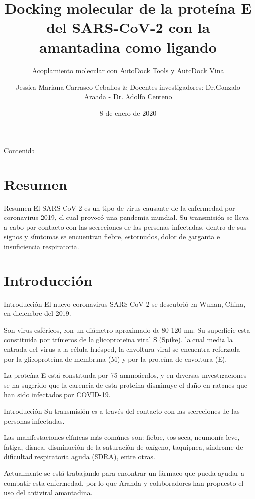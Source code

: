 \documentclass[11pt]{beamer}
\author[Jessica]{Jessica Mariana Carrasco Ceballos\inst{1} \& Docentes-investigadores: Dr.Gonzalo Aranda - Dr. Adolfo Centeno  \inst{1}}
\title[Docking molecular]{Docking molecular de la proteína E del SARS-CoV-2 con la amantadina como ligando}
\date{8 de enero de 2020}
\subtitle{Acoplamiento molecular con AutoDock Tools y AutoDock Vina}
\institute[UV]{
	\inst{1}
		Universidad Veracruzana. \\Instituto de Investigaciones Cerebrales.\\
		\vspace{2mm}
	
}
\begin{document}
	
	\begin{frame}
		\maketitle
	\end{frame}

	\begin{frame}{Contenido}
		\tableofcontents
	\end{frame}

	\section{Resumen}
		\begin{frame}{Resumen}
			\justifying El SARS-CoV-2 es un tipo de virus causante de la enfermedad por coronavirus 2019, el cual provocó una pandemia mundial. Su transmisión se lleva a cabo por contacto con las secreciones de las personas infectadas, dentro de sus signos y símtomas se encuentran fiebre, estornudos, dolor de garganta e insuficiencia respiratoria.
		\end{frame}
	
	\section{Introducción}
		\begin{frame}{Introducción}
			\justifying El nuevo coronavirus SARS-CoV-2 se descubrió en Wuhan, China, en diciembre del 2019. 
			
			Son virus esféricos, con un diámetro aproximado de 80-120 nm. Su superficie esta constituida por trímeros de la glicoproteína viral S (Spike), la cual media la entrada del virus a la célula huésped, la envoltura viral se encuentra reforzada por la glicoproteína de membrana (M) y por la proteína de envoltura (E).
			
			La proteína E está constituida por 75 aminoácidos, y en diversas investigaciones se ha sugerido que la carencia de esta proteína disminuye el daño en ratones que han sido infectados por COVID-19.
			\end{frame}
			
			\begin{frame}{Introducción}
			Su transmisión es a través del contacto con las secreciones de las personas infectadas.
			
			Las manifestaciones clínicas más comúnes son: fiebre, tos seca, neumonía leve, fatiga, disnea, disminución de la saturación de oxígeno, taquipnea, síndrome de dificultad respiratoria aguda (SDRA), entre otras.
			
			Actualmente se está trabajando para encontrar un fármaco que pueda ayudar a combatir esta enfermedad, por lo que Aranda y colaboradores han propuesto el uso del antiviral amantadina.
		\end{frame}
		
\end{document}
